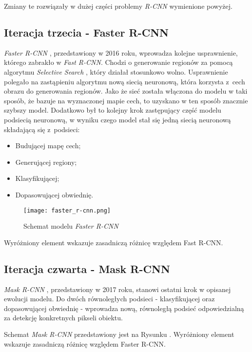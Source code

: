 Zmiany te rozwiązały w dużej części problemy \textit{R-CNN} wymienione powyżej.

\subsection{Iteracja trzecia - Faster R-CNN}

\textit{Faster R-CNN} \cite{faster-rcnn}, przedstawiony w 2016 roku, wprowadza kolejne usprawnienie, którego zabrakło w \textit{Fast R-CNN}.
Chodzi o generowanie regionów za pomocą algorytmu \textit{Selective Search} \cite{selective-search}, który działał stosunkowo wolno.
Usprawnienie polegało na zastąpieniu algorytmu nową siecią neuronową, która korzysta z~cech obrazu do generowania regionów.
Jako że sieć została włączona do modelu w taki sposób, że bazuje na wyznaczonej mapie cech, to uzyskano w ten sposób znacznie szybszy model.
Dodatkowo był to kolejny krok zastępujący część modelu podsiecią neuronową, w wyniku czego model stał się jedną siecią neuronową składającą się z~podsieci:

\begin{itemize}
	\item Budującej mapę cech;
	\item Generującej regiony;
	\item Klasyfikującej;
	\item Dopasowującej obwiednię.
\end{itemize}

\begin{figure}[h]
  \centering
  \texttt{[image: faster\_r-cnn.png]}
  \caption{Schemat modelu \textit{Faster R-CNN}}
  \label{fig:faster_r_cnn}
\end{figure}

Wyróżniony element wskazuje zasadniczą różnicę względem Fast R-CNN.

\newpage
\subsection{Iteracja czwarta - Mask R-CNN}
\label{sec:maskrcnn}
\textit{Mask R-CNN} \cite{matterport-mask-rcnn}, przedstawiony w 2017 roku, stanowi ostatni krok w opisanej ewolucji modelu.
Do dwóch równoległych podsieci - klasyfikującej oraz dopasowującej obwiednię - wprowadza nową, równoległą podsieć odpowiedzialną za detekcję konkretnych pikseli obiektu.

Schemat \textit{Mask R-CNN} przedstawiony jest na Rysunku . Wyróżniony element wskazuje zasadniczą różnicę względem Faster R-CNN.

